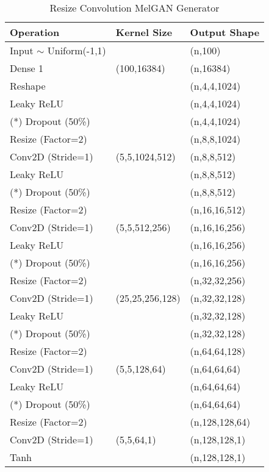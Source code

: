 \begin{table}[h]
\caption{Resize Convolution MelGAN Generator}\label{melgan_gen}
\centering
\begin{tabular}{l|l|l}
Operation & Kernel Size & Output Shape \\ \hline
Input $\sim$ Uniform(-1,1) & \  & (n,100)\\
Dense 1 & (100,16384) & (n,16384)\\
Reshape & \ & (n,4,4,1024)\\
Leaky ReLU & \ & (n,4,4,1024)\\
(*) Dropout (50\%) & \ & (n,4,4,1024)\\
Resize (Factor=2) & \ & (n,8,8,1024)\\
Conv2D (Stride=1) & (5,5,1024,512) & (n,8,8,512)\\
Leaky ReLU & \  & (n,8,8,512)\\
(*) Dropout (50\%) & \  & (n,8,8,512)\\
Resize (Factor=2) & \ & (n,16,16,512)\\
Conv2D (Stride=1) & (5,5,512,256) & (n,16,16,256)\\
Leaky ReLU & \  & (n,16,16,256)\\
(*) Dropout (50\%) & \  & (n,16,16,256)\\
Resize (Factor=2) & \ & (n,32,32,256)\\
Conv2D (Stride=1) & (25,25,256,128) & (n,32,32,128)\\
Leaky ReLU & \  & (n,32,32,128)\\
(*) Dropout (50\%) & \  & (n,32,32,128)\\
Resize (Factor=2) & \ & (n,64,64,128)\\
Conv2D (Stride=1) & (5,5,128,64) & (n,64,64,64)\\
Leaky ReLU & \  & (n,64,64,64)\\
(*) Dropout (50\%) & \  & (n,64,64,64)\\
Resize (Factor=2) & \ & (n,128,128,64)\\
Conv2D (Stride=1) & (5,5,64,1) & (n,128,128,1)\\
Tanh & \  & (n,128,128,1)\\
\end{tabular}
\end{table}


